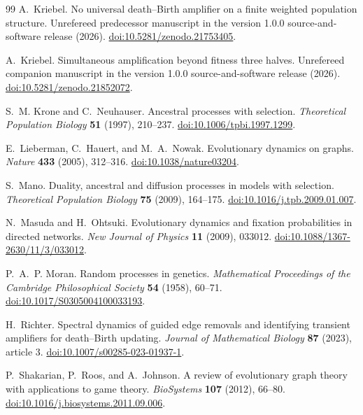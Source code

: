 \begin{thebibliography}{99}
A.~Kriebel.
No universal death--Birth amplifier on a finite weighted population structure.
Unrefereed predecessor manuscript in the version 1.0.0 source-and-software
release (2026).
\href{https://doi.org/10.5281/zenodo.21753405}
{doi:10.5281/zenodo.21753405}.

A.~Kriebel.
Simultaneous amplification beyond fitness three halves.
Unrefereed companion manuscript in the version 1.0.0 source-and-software
release (2026).
\href{https://doi.org/10.5281/zenodo.21852072}
{doi:10.5281/zenodo.21852072}.

S.~M. Krone and C.~Neuhauser.
Ancestral processes with selection.
\emph{Theoretical Population Biology} \textbf{51} (1997), 210--237.
\href{https://doi.org/10.1006/tpbi.1997.1299}
{doi:10.1006/tpbi.1997.1299}.

E.~Lieberman, C.~Hauert, and M.~A.~Nowak.
Evolutionary dynamics on graphs.
\emph{Nature} \textbf{433} (2005), 312--316.
\href{https://doi.org/10.1038/nature03204}{doi:10.1038/nature03204}.

S.~Mano.
Duality, ancestral and diffusion processes in models with selection.
\emph{Theoretical Population Biology} \textbf{75} (2009), 164--175.
\href{https://doi.org/10.1016/j.tpb.2009.01.007}
{doi:10.1016/j.tpb.2009.01.007}.

N.~Masuda and H.~Ohtsuki.
Evolutionary dynamics and fixation probabilities in directed networks.
\emph{New Journal of Physics} \textbf{11} (2009), 033012.
\href{https://doi.org/10.1088/1367-2630/11/3/033012}
{doi:10.1088/1367-2630/11/3/033012}.

P.~A.~P. Moran.
Random processes in genetics.
\emph{Mathematical Proceedings of the Cambridge Philosophical Society}
\textbf{54} (1958), 60--71.
\href{https://doi.org/10.1017/S0305004100033193}
{doi:10.1017/S0305004100033193}.

H.~Richter.
Spectral dynamics of guided edge removals and identifying transient
amplifiers for death--Birth updating.
\emph{Journal of Mathematical Biology} \textbf{87} (2023), article 3.
\href{https://doi.org/10.1007/s00285-023-01937-1}
{doi:10.1007/s00285-023-01937-1}.

P.~Shakarian, P.~Roos, and A.~Johnson.
A review of evolutionary graph theory with applications to game theory.
\emph{BioSystems} \textbf{107} (2012), 66--80.
\href{https://doi.org/10.1016/j.biosystems.2011.09.006}
{doi:10.1016/j.biosystems.2011.09.006}.


\end{thebibliography}

